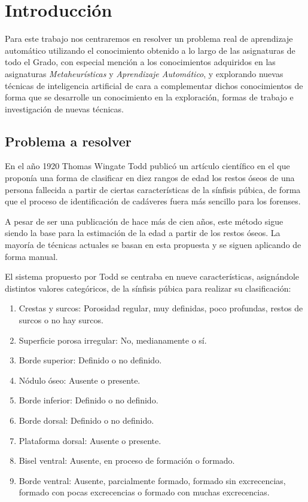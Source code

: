 \section{Introducción}

Para este trabajo nos centraremos en resolver un problema real de aprendizaje automático utilizando el conocimiento obtenido a lo largo de las asignaturas de todo el Grado, con especial mención a los conocimientos adquiridos en las asignaturas \textit{Metaheurísticas} y \textit{Aprendizaje Automático}, y explorando nuevas técnicas de inteligencia artificial de cara a complementar dichos conocimientos de forma que se desarrolle un conocimiento en la exploración, formas de trabajo e investigación de nuevas técnicas.

\subsection{Problema a resolver}

En el año 1920 Thomas Wingate Todd publicó un artículo científico \cite{todd} en el que proponía una forma de clasificar en diez rangos de edad los restos óseos de una persona fallecida a partir de ciertas características de la sínfisis púbica, de forma que el proceso de identificación de cadáveres fuera más sencillo para los forenses.

A pesar de ser una publicación de hace más de cien años, este método sigue siendo la base para la estimación de la edad a partir de los restos óseos. La mayoría de técnicas actuales se basan en esta propuesta y se siguen aplicando de forma manual.

El sistema propuesto por Todd se centraba en nueve características, asignándole distintos valores categóricos, de la sínfisis púbica para realizar su clasificación:

\begin{enumerate}
	\item Crestas y surcos: Porosidad regular, muy definidas, poco profundas, restos de surcos o no hay surcos.
	\item Superficie porosa irregular: No, medianamente o sí.
	\item Borde superior: Definido o no definido.
	\item Nódulo óseo: Ausente o presente.
	\item Borde inferior: Definido o no definido.
	\item Borde dorsal: Definido o no definido.
	\item Plataforma dorsal: Ausente o presente.
	\item Bisel ventral: Ausente, en proceso de formación o formado.
	\item Borde ventral: Ausente, parcialmente formado, formado sin excrecencias, formado con pocas excrecencias o formado con muchas excrecencias.
\end{enumerate}


